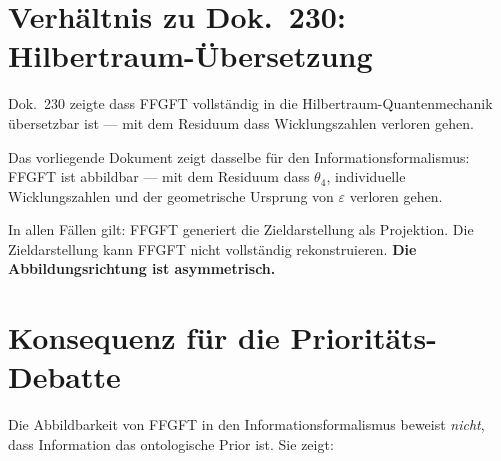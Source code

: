 \section{Verhältnis zu Dok.~230: Hilbertraum-Über\-setzung}

Dok.~230 zeigte dass FFGFT vollständig in die Hilbertraum-Quantenmechanik
übersetzbar ist --- mit dem Residuum dass Wicklungszahlen verloren gehen.

Das vorliegende Dokument zeigt dasselbe für den Informationsformalismus:
FFGFT ist abbildbar --- mit dem Residuum dass $\theta_4$, individuelle
Wicklungszahlen und der geometrische Ursprung von $\varepsilon$ verloren gehen.

\begin{center}
\renewcommand{\arraystretch}{1.3}
{\small
{}
}
\end{center}

In allen Fällen gilt: FFGFT generiert die Zieldarstellung als Projektion.
Die Zieldarstellung kann FFGFT nicht vollständig rekonstruieren.
\textbf{Die Abbildungsrichtung ist asymmetrisch.}

\section{Konsequenz für die Prioritäts-Debatte}

Die Abbildbarkeit von FFGFT in den Informationsformalismus beweist
\emph{nicht}, dass Information das ontologische Prior ist. Sie zeigt:

